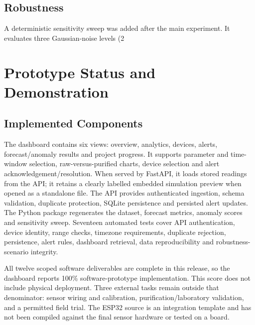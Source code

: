 \documentclass[10pt,letterpaper,twocolumn]{article}
\begin{document}
\subsection{Robustness}
A deterministic sensitivity sweep was added after the main experiment. It evaluates three Gaussian-noise levels (2%

\section{Prototype Status and Demonstration}
\subsection{Implemented Components}
The dashboard contains six views: overview, analytics, devices, alerts, forecast/anomaly results and project progress. It supports parameter and time-window selection, raw-versus-purified charts, device selection and alert acknowledgement/resolution. When served by FastAPI, it loads stored readings from the API; it retains a clearly labelled embedded simulation preview when opened as a standalone file. The API provides authenticated ingestion, schema validation, duplicate protection, SQLite persistence and persisted alert updates. The Python package regenerates the dataset, forecast metrics, anomaly scores and sensitivity sweep. Seventeen automated tests cover API authentication, device identity, range checks, timezone requirements, duplicate rejection, persistence, alert rules, dashboard retrieval, data reproducibility and robustness-scenario integrity.

All twelve scoped software deliverables are complete in this release, so the dashboard reports 100\% software-prototype implementation. This score does not include physical deployment. Three external tasks remain outside that denominator: sensor wiring and calibration, purification/laboratory validation, and a permitted field trial. The ESP32 source is an integration template and has not been compiled against the final sensor hardware or tested on a board.
\end{document}
